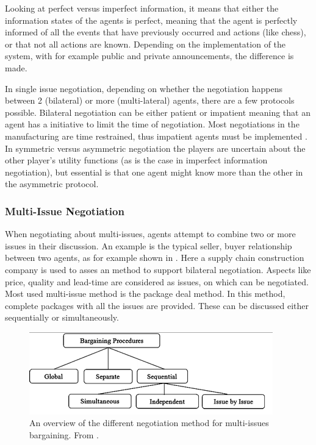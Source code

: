 Looking at perfect versus imperfect information, it means that either the information states of the agents is perfect, meaning that the agent is perfectly informed of all the events that have previously occurred and actions (like chess), or that not all actions are known. Depending on the implementation of the system, with for example public and private announcements, the difference is made. 

In single issue negotiation, depending on whether the negotiation happens between 2 (bilateral) or more (multi-lateral) agents, there are a few protocols possible. Bilateral negotiation can be either patient or impatient \citep{fatima2014negotiation} meaning that an agent has a initiative to limit the time of negotiation. Most negotiations in the manufacturing are time restrained, thus impatient agents must be implemented \citep{kraus1995multiagent}. In symmetric versus asymmetric negotiation the players are uncertain about the other player's utility functions (as is the case in imperfect information negotiation), but essential is that one agent might know more than the other in the asymmetric protocol.

\subsubsection{Multi-Issue Negotiation}
 When negotiating about multi-issues, agents attempt to combine two or more issues in their discussion. An example is the typical seller, buyer relationship between two agents, as for example shown in \citep{schramm2013bilateral}. Here a supply chain construction company is used to asses an method to support bilateral negotiation. Aspects like price, quality and lead-time are considered as issues, on which can be negotiated. Most used multi-issue method is the package deal method. In this method, complete packages with all the issues are provided. These can be discussed either sequentially or simultaneously. 

 \begin{figure}[h]
 	\centering
 	\includegraphics[width=0.7\linewidth]{img/multi-lateral}
 	\caption{An overview of the different negotiation method for multi-issues bargaining. From \citep{abedin2014agenda}.}
 	\label{fig:multi-lateral}
 \end{figure}
 
